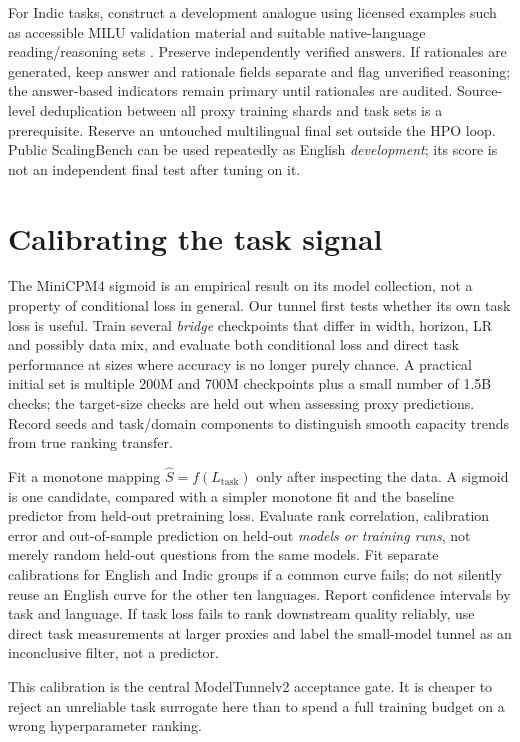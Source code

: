 \documentclass[10pt,a4paper]{article}
\newcommand{\MT}{ModelTunnelv2}
\begin{document}
For Indic tasks, construct a development analogue using licensed examples such as accessible MILU validation material and suitable native-language reading/reasoning sets \cite{milu}. Preserve independently verified answers. If rationales are generated, keep answer and rationale fields separate and flag unverified reasoning; the answer-based indicators remain primary until rationales are audited. Source-level deduplication between all proxy training shards and task sets is a prerequisite. Reserve an untouched multilingual final set outside the HPO loop. Public ScalingBench can be used repeatedly as English \emph{development}; its score is not an independent final test after tuning on it.

\section{Calibrating the task signal}
\label{sec:calib}

The MiniCPM4 sigmoid is an empirical result on its model collection, not a property of conditional loss in general. Our tunnel first tests whether its own task loss is useful. Train several \emph{bridge} checkpoints that differ in width, horizon, LR and possibly data mix, and evaluate both conditional loss and direct task performance at sizes where accuracy is no longer purely chance. A practical initial set is multiple 200M and 700M checkpoints plus a small number of 1.5B checks; the target-size checks are held out when assessing proxy predictions. Record seeds and task/domain components to distinguish smooth capacity trends from true ranking transfer.

Fit a monotone mapping $\widehat S=f(L_{\mathrm{task}})$ only after inspecting the data. A sigmoid is one candidate, compared with a simpler monotone fit and the baseline predictor from held-out pretraining loss. Evaluate rank correlation, calibration error and out-of-sample prediction on held-out \emph{models or training runs}, not merely random held-out questions from the same models. Fit separate calibrations for English and Indic groups if a common curve fails; do not silently reuse an English curve for the other ten languages. Report confidence intervals by task and language. If task loss fails to rank downstream quality reliably, use direct task measurements at larger proxies and label the small-model tunnel as an inconclusive filter, not a predictor.

This calibration is the central \MT{} acceptance gate. It is cheaper to reject an unreliable task surrogate here than to spend a full training budget on a wrong hyperparameter ranking.
\end{document}
